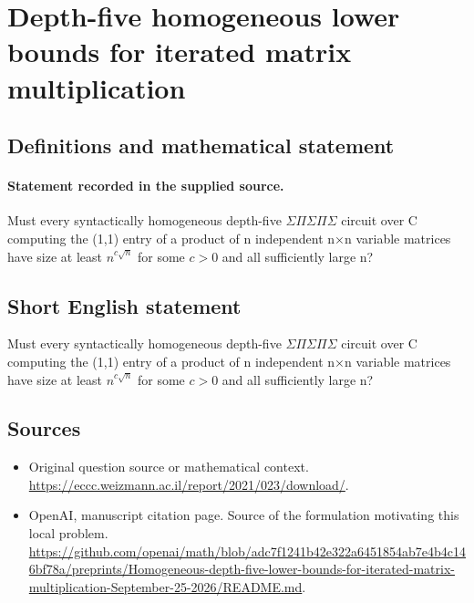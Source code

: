 \documentclass[11pt]{article}
\begin{document}
\section*{Depth-five homogeneous lower bounds for iterated matrix multiplication}\label{statement}
\subsection{Definitions and mathematical statement}
\paragraph{Statement recorded in the supplied source.}
Must every syntactically homogeneous depth-five $\Sigma \Pi \Sigma \Pi \Sigma $ circuit over C computing the (1,1) entry of a product of n independent n×n variable matrices have size at least $n^{c\surd n}$ for some $c>0$ and all sufficiently large n?
\subsection{Short English statement}
Must every syntactically homogeneous depth-five $\Sigma \Pi \Sigma \Pi \Sigma $ circuit over C computing the (1,1) entry of a product of n independent n×n variable matrices have size at least $n^{c\surd n}$ for some $c>0$ and all sufficiently large n?
\subsection{Sources}
\begin{itemize}
\item[S1] Original question source or mathematical context.
\url{https://eccc.weizmann.ac.il/report/2021/023/download/}.
\item[S2] OpenAI, manuscript citation page. Source of the formulation motivating this local problem.
\url{https://github.com/openai/math/blob/adc7f1241b42e322a6451854ab7e4b4c146bf78a/preprints/Homogeneous-depth-five-lower-bounds-for-iterated-matrix-multiplication-September-25-2026/README.md}.
\end{itemize}
\end{document}
